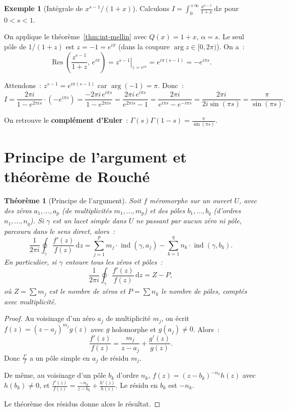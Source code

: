 \documentclass[12pt,a4paper,openany]{book}
\theoremstyle{definition}
\newtheorem{exemple}[definition]{Exemple}
\theoremstyle{plain}
\newtheorem{theoreme}[definition]{Théorème}
\theoremstyle{remark}
\DeclareMathOperator{\Res}{Res}
\DeclareMathOperator{\ind}{ind}
\newcommand{\dd}{\mathrm{d}}
\begin{document}
\begin{exemple}[Intégrale de $x^{s-1}/(1+x)$]\label{ex:int-mellin-2}
Calculons $\displaystyle I = \int_0^{+\infty} \frac{x^{s-1}}{1+x}\, \dd x$
pour $0 < s < 1$.

On applique le théorème~\ref{thm:int-mellin} avec $Q(x) = 1+x$, $\alpha = s$.
Le seul pôle de $1/(1+z)$ est $z = -1 = e^{i\pi}$ (dans la coupure
$\arg z \in [0, 2\pi)$). On a~:
\[
  \Res\!\left(\frac{z^{s-1}}{1+z},\, e^{i\pi}\right)
  = \left. z^{s-1}\right|_{z=e^{i\pi}} = e^{i\pi(s-1)} = -e^{i\pi s}.
\]

Attendons~: $z^{s-1} = e^{i\pi(s-1)}$ car $\arg(-1) = \pi$. Donc~:
\[
  I = \frac{2\pi i}{1 - e^{2\pi is}} \cdot (-e^{i\pi s})
  = \frac{-2\pi i\, e^{i\pi s}}{1 - e^{2\pi is}}
  = \frac{2\pi i\, e^{i\pi s}}{e^{2\pi is} - 1}
  = \frac{2\pi i}{e^{i\pi s} - e^{-i\pi s}}
  = \frac{2\pi i}{2i\sin(\pi s)}
  = \frac{\pi}{\sin(\pi s)}.
\]

On retrouve le \textbf{complément d'Euler}~: $\Gamma(s)\Gamma(1-s) = \frac{\pi}{\sin(\pi s)}$.
\end{exemple}

\section{Principe de l'argument et théorème de Rouché}\label{sec:argument-rouche}

\begin{theoreme}[Principe de l'argument]\label{thm:principe-argument}
Soit $f$ méromorphe sur un ouvert $U$, avec des zéros $a_1, \ldots, a_p$
(de multiplicités $m_1, \ldots, m_p$) et des pôles $b_1, \ldots, b_q$
(d'ordres $n_1, \ldots, n_q$). Si $\gamma$ est un lacet simple dans $U$
ne passant par aucun zéro ni pôle, parcouru dans le sens direct, alors~:
\[
  \frac{1}{2\pi i} \oint_{\gamma} \frac{f'(z)}{f(z)}\, \dd z
  = \sum_{j=1}^{p} m_j \cdot \ind(\gamma, a_j) - \sum_{k=1}^{q} n_k \cdot \ind(\gamma, b_k).
\]
En particulier, si $\gamma$ entoure tous les zéros et pôles~:
\[
  \frac{1}{2\pi i} \oint_{\gamma} \frac{f'(z)}{f(z)}\, \dd z = Z - P,
\]
où $Z = \sum m_j$ est le nombre de zéros et $P = \sum n_k$ le nombre de pôles,
comptés avec multiplicité.
\end{theoreme}

\begin{proof}
Au voisinage d'un zéro $a_j$ de multiplicité $m_j$, on écrit
$f(z) = (z-a_j)^{m_j} g(z)$ avec $g$ holomorphe et $g(a_j) \neq 0$.
Alors~:
\[
  \frac{f'(z)}{f(z)} = \frac{m_j}{z - a_j} + \frac{g'(z)}{g(z)}.
\]
Donc $\frac{f'}{f}$ a un pôle simple en $a_j$ de résidu $m_j$.

De même, au voisinage d'un pôle $b_k$ d'ordre $n_k$,
$f(z) = (z-b_k)^{-n_k} h(z)$ avec $h(b_k) \neq 0$, et
$\frac{f'(z)}{f(z)} = \frac{-n_k}{z-b_k} + \frac{h'(z)}{h(z)}$.
Le résidu en $b_k$ est $-n_k$.

Le théorème des résidus donne alors le résultat.
\end{proof}
\end{document}
